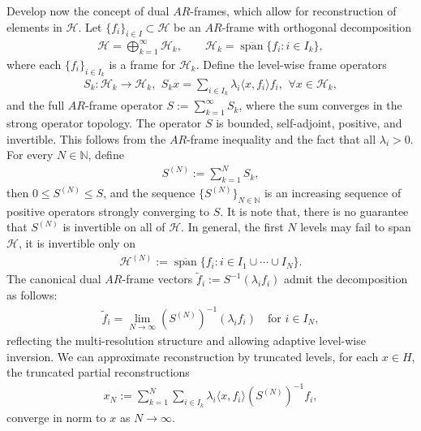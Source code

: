 \documentclass[12pt,titlepage]{amsart}
\theoremstyle{definition}
\theoremstyle{remark}
\begin{document}
Develop now the concept of dual $AR$-frames, which allow for
reconstruction of elements in $\mathcal{H}$. Let $\{f_i\}_{i\in
I}\subset\mathcal H$ be an $AR$-frame with orthogonal
decomposition
\begin{eqnarray*}
\mathcal H=\bigoplus_{k=1}^{\infty}\mathcal H_k, \qquad \mathcal
H_k=\overline{\operatorname{span}}\{f_i:i\in I_k\},
\end{eqnarray*}
where each $\{f_i\}_{i\in I_k}$ is a frame for $\mathcal H_k$.
Define the level-wise frame operators
\begin{eqnarray*}
S_k:\mathcal{H}_k \rightarrow \mathcal{H}_k, \,\ S_kx = \sum_{i
\in I_k} \lambda_i \langle x, f_i \rangle f_i, \,\ \forall x \in
\mathcal{H}_k,
\end{eqnarray*}
and the full $AR$-frame operator $S:=\sum_{k=1}^{\infty}S_k$,
where the sum converges in the strong operator topology. The
operator $S$ is bounded, self-adjoint, positive, and invertible.
This follows from the $AR$-frame inequality and the fact that all
$\lambda_i > 0$. For every $N \in \mathbb{N}$, define
\begin{eqnarray*}
S^{(N)} := \sum_{k=1}^N S_k,
\end{eqnarray*}
then $0 \leq S^{(N)} \leq S$, and the sequence $\{S^{(N)}\}_{N \in
\mathbb{N}}$ is an increasing sequence of positive operators
strongly converging to $S$. It is note that, there is no guarantee
that $S^{(N)}$ is invertible on all of $\mathcal H$. In general,
the first $N$ levels may fail to span $\mathcal H$, it is
invertible only on
\begin{eqnarray*}
\mathcal H^{(N)} := \overline{\operatorname{span}} \{f_i:i\in
I_1\cup\cdots\cup I_N\}.
\end{eqnarray*}
The canonical dual $AR$-frame vectors $\tilde{f}_i :=
S^{-1}(\lambda_if_i)$ admit the decomposition as follows:
\begin{eqnarray}
\tilde{f}_i = \lim_{N \to \infty} (S^{(N)})^{-1} (\lambda_if_i)
\quad \text{for }
i \in I_N,
\end{eqnarray}
reflecting the multi-resolution structure and allowing adaptive
level-wise inversion. We can approximate reconstruction by
truncated levels, for each $x \in H$, the truncated partial
reconstructions
\begin{eqnarray}
x_N :=  \sum_{k=1}^N \sum_{i \in I_k} \lambda_i \langle x, f_i
\rangle (S^{(N)})^{-1}f_i ,
\end{eqnarray}
converge in norm to $x$ as $N \to \infty$.\\
\end{document}
